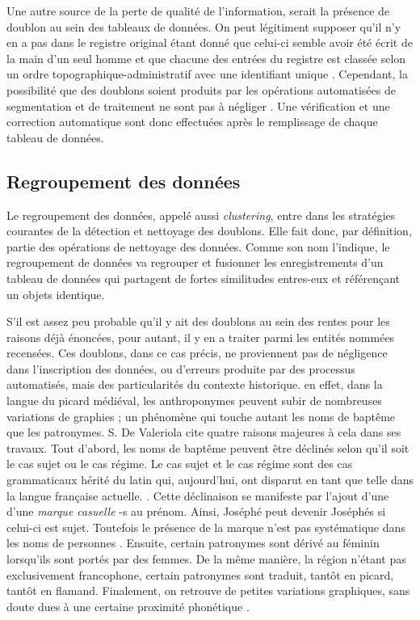 Une autre source de la perte de qualité de l'information, serait la présence de doublon au sein des tableaux de données. On peut légitiment supposer qu'il n'y en a pas dans le registre original étant donné que celui-ci semble avoir été écrit de la main d'un seul homme  et que chacune des entrées du registre est classée selon un ordre topographique-administratif avec une identifiant unique \parencite{espinas_les_1933}. Cependant, la possibilité que des doublons soient produits par les opérations automatisées de segmentation et de traitement ne sont pas à négliger \parencite{koudoro-parfait_reconnaissance_2022}. Une vérification et une correction automatique sont donc effectuées après le remplissage de chaque tableau de données.

\subsection{Regroupement des données}
Le regroupement des données, appelé aussi \textit{clustering}, entre dans les stratégies courantes de la détection et nettoyage des doublons. Elle fait donc, par définition, partie des opérations de nettoyage des données. Comme son nom l'indique, le regroupement de données va regrouper et fusionner les enregistrements d'un tableau de données qui partagent de fortes similitudes entres-eux et référençant un objets identique. 

S'il est assez peu probable qu'il y ait des doublons au sein des rentes pour les raisons déjà énoncées, pour autant, il y en a traiter parmi les entités nommées recensées. Ces doublons, dans ce cas précis, ne proviennent pas de négligence dans l'inscription des données, ou d'erreurs  produite par des processus automatisés, mais des particularités du contexte historique.
en effet, dans la langue du picard médiéval, les anthroponymes peuvent subir de nombreuses variations de graphies ; un phénomène qui touche autant les noms de baptême que les patronymes. S. De Valeriola cite quatre raisons majeures à cela dans ses travaux.
Tout d'abord, les noms de baptême peuvent être déclinés selon qu'il soit le cas sujet ou le cas régime\parencite{de_valeriola_lordinateur_2021}. Le cas sujet et le cas régime sont des cas grammaticaux hérité du latin qui, aujourd'hui, ont disparut en tant que telle dans la langue française actuelle. \parencite{kalm_roland_2009}.
Cette déclinaison se manifeste par l'ajout d'une d'une \textit{marque casuelle} \og -s \fg{} au prénom. Ainsi, \og Joséphé \fg{} peut devenir \og Joséphés \fg{} si celui-ci est sujet. Toutefois le présence de la marque n'est pas systématique dans les noms de personnes \parencite{mazziotta_marquage_2014}.
Ensuite, certain patronymes sont dérivé au féminin lorsqu'ils sont portés par des femmes. De la même manière, la région n'étant pas exclusivement francophone, certain patronymes sont traduit, tantôt en picard, tantôt en flamand. Finalement, on retrouve de petites variations graphiques, sans doute dues à une certaine proximité phonétique \parencite{de_valeriola_lordinateur_2021}.

